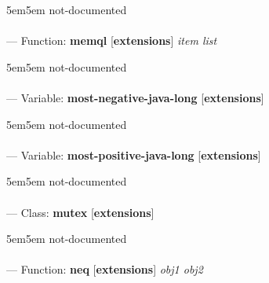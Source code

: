 \begin{adjustwidth}{5em}{5em}
not-documented
\end{adjustwidth}

\paragraph{}
\label{EXTENSIONS:MEMQL}
--- Function: \textbf{memql} [\textbf{extensions}] \textit{item list}

\begin{adjustwidth}{5em}{5em}
not-documented
\end{adjustwidth}

\paragraph{}
\label{EXTENSIONS:MOST-NEGATIVE-JAVA-LONG}
--- Variable: \textbf{most-negative-java-long} [\textbf{extensions}] \textit{}

\begin{adjustwidth}{5em}{5em}
not-documented
\end{adjustwidth}

\paragraph{}
\label{EXTENSIONS:MOST-POSITIVE-JAVA-LONG}
--- Variable: \textbf{most-positive-java-long} [\textbf{extensions}] \textit{}

\begin{adjustwidth}{5em}{5em}
not-documented
\end{adjustwidth}

\paragraph{}
\label{EXTENSIONS:MUTEX}
--- Class: \textbf{mutex} [\textbf{extensions}] \textit{}

\begin{adjustwidth}{5em}{5em}
not-documented
\end{adjustwidth}

\paragraph{}
\label{EXTENSIONS:NEQ}
--- Function: \textbf{neq} [\textbf{extensions}] \textit{obj1 obj2}

